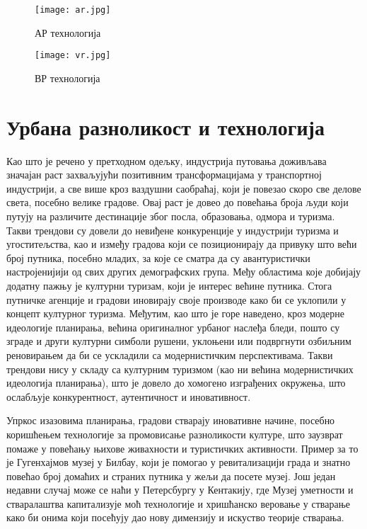 \documentclass{article}
\begin{document}
\begin{figure}[H]
\centering
\texttt{[image: ar.jpg]}
\caption{АР технологија}
\end{figure}

\begin{figure}[H]
\centering
\texttt{[image: vr.jpg]}
\caption{ВР технологија}
\end{figure}

\section{Урбана разноликост и технологија}

Као што је речено у претходном одељку, индустрија путовања доживљава значајан раст захваљујући позитивним трансформацијама у транспортној индустрији, а све више кроз ваздушни саобраћај, који је повезао скоро све делове света, посебно велике градове. Овај раст је довео до повећања броја људи који путују на различите дестинације због посла, образовања, одмора и туризма. Такви трендови су довели до невиђене конкуренције у индустрији туризма и угоститељства, као и између градова који се позиционирају да привуку што већи број путника, посебно младих, за које се сматра да су авантуристички настројенијији од свих других демографских група. Међу областима које добијају додатну пажњу је културни туризам, који је интерес већине путника. Стога путничке агенције и градови иновирају своје производе како би се уклопили у концепт културног туризма. Међутим, као што је горе наведено, кроз модерне идеологије планирања, већина оригиналног урбаног наслеђа бледи, пошто су зграде и други културни симболи рушени, уклоњени или подвргнути озбиљним реновирањем да би се ускладили са модернистичким перспективама. Такви трендови нису у складу са културним туризмом (као ни већина модернистичких идеологија планирања), што је довело до хомогено изграђених окружења, што ослабљује конкурентност, аутентичност и иновативност.

Упркос изазовима планирања, градови стварају иновативне начине, посебно коришћењем технологије за промовисање разноликости културе, што заузврат помаже у повећању њихове живахности и туристичких активности. Пример за то је Гугенхајмов музеј у Билбау, који је помогао у ревитализацији града и знатно повећао број домаћих и страних путника у жељи да посете музеј. Још један недавни случај може се наћи у Петерсбургу у Кентакију, где Музеј уметности и стваралаштва капитализује моћ технологије и хришћанско веровање у стварање како би онима који посећују дао нову димензију и искуство теорије стварања.
\end{document}
